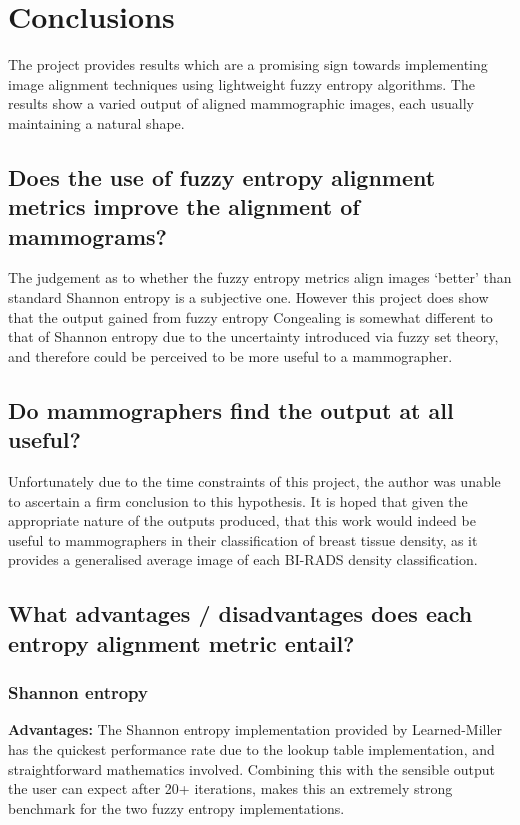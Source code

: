 \section{Conclusions}

The project provides results which are a promising sign towards implementing image alignment techniques using lightweight fuzzy entropy algorithms. The results show a varied output of aligned mammographic images, each usually maintaining a natural shape.

\subsection{Does the use of fuzzy entropy alignment metrics improve the alignment of mammograms?}

The judgement as to whether the fuzzy entropy metrics align images `better' than standard Shannon entropy is a subjective one. However this project does show that the output gained from fuzzy entropy \gls{Congealing} is somewhat different to that of Shannon entropy due to the uncertainty introduced via fuzzy set theory, and therefore could be perceived to be more useful to a mammographer.

\subsection{Do mammographers find the output at all useful?}

Unfortunately due to the time constraints of this project, the author was unable to ascertain a firm conclusion to this hypothesis. It is hoped that given the appropriate nature of the outputs produced, that this work would indeed be useful to mammographers in their classification of breast tissue density, as it provides a generalised average image of each BI-RADS density classification.

\subsection{What advantages / disadvantages does each entropy alignment metric entail?}

\subsubsection{Shannon entropy}

\textbf{Advantages: }
The Shannon entropy implementation provided by Learned-Miller has the quickest performance rate due to the lookup table implementation, and straightforward mathematics involved. Combining this with the sensible output the user can expect after 20+ iterations, makes this an extremely strong benchmark for the two fuzzy entropy implementations.

